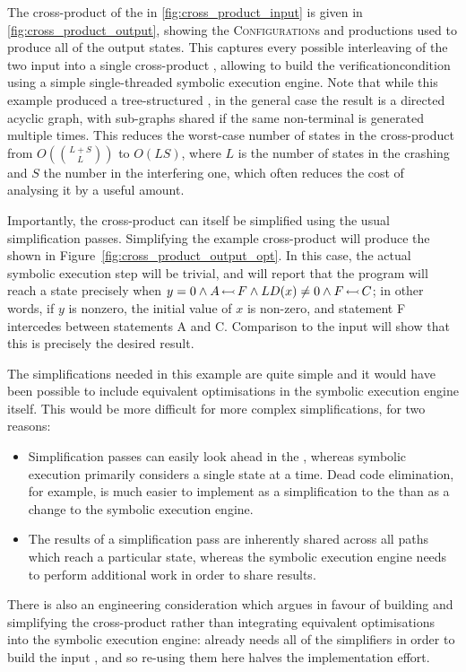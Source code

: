 The cross-product of the {\StateMachines} in
\autoref{fig:cross_product_input} is given in
\autoref{fig:cross_product_output}, showing the
\textsc{Configuration}s and productions used to produce all of the
output states.  This captures every possible interleaving of the two
input {\StateMachines} into a single cross-product {\StateMachine},
allowing {\technique} to build the \gls{verificationcondition} using a
simple single-threaded symbolic execution engine.  Note that while
this example produced a tree-structured {\StateMachine}, in the
general case the result is a directed acyclic graph, with sub-graphs
shared if the same non-terminal is generated multiple times.  This
reduces the worst-case number of states in the cross-product
{\StateMachine} from $O(\binom{L+S}{L})$ to $O(LS)$, where $L$ is the
number of states in the crashing {\StateMachine} and $S$ the number in
the interfering one, which often reduces the cost of analysing it by a
useful amount.

Importantly, the cross-product {\StateMachine} can itself be
simplified using the usual {\StateMachine} simplification passes.
Simplifying the example cross-product {\StateMachine} will produce the
{\StateMachine} shown in Figure~\ref{fig:cross_product_output_opt}.
In this case, the actual symbolic execution step will be trivial, and
will report that the program will reach a {\stCrash} state precisely
when $y = 0 \wedge A\,{\leftarrowtail}\,F \wedge LD(x) \not= 0 \wedge
F\,{\leftarrowtail}\,C$; in other words, if $y$ is nonzero, the initial
value of $x$ is non-zero, and statement F intercedes between
statements A and C.  Comparison to the input {\StateMachines} will
show that this is precisely the desired result.

The simplifications needed in this example are quite simple and it
would have been possible to include equivalent optimisations in the
symbolic execution engine itself.  This would be more difficult for
more complex simplifications, for two reasons:
\begin{itemize}
\item Simplification passes can easily look ahead in the
  {\StateMachine}, whereas symbolic execution primarily considers a
  single state at a time.  Dead code elimination, for example, is much
  easier to implement as a simplification to the {\StateMachine} than
  as a change to the symbolic execution engine.
\item The results of a simplification pass are inherently shared
  across all paths which reach a particular state, whereas the
  symbolic execution engine needs to perform additional work in order
  to share results.
\end{itemize}
There is also an engineering consideration which argues in favour of
building and simplifying the cross-product {\StateMachine} rather than
integrating equivalent optimisations into the symbolic execution
engine: {\implementation} already needs all of the simplifiers in
order to build the input {\StateMachines}, and so re-using them here
halves the implementation effort.

